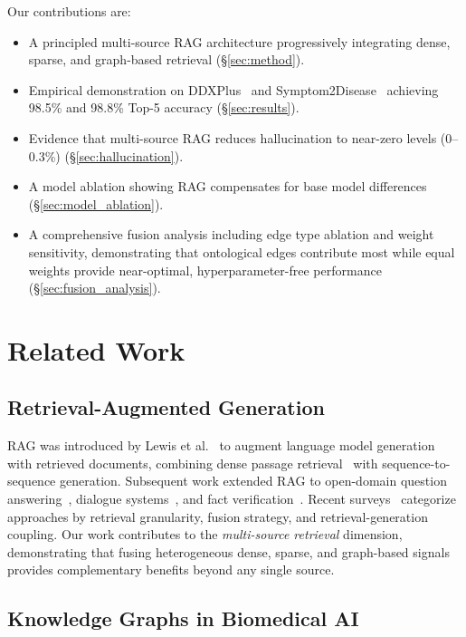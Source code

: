 \documentclass[preprint,12pt]{elsarticle}
\begin{document}
Our contributions are:
\begin{itemize}
    \item A principled multi-source RAG architecture progressively integrating dense, sparse, and graph-based retrieval (\S\ref{sec:method}).
    \item Empirical demonstration on DDXPlus~\cite{fansi2022ddxplus} and Symptom2Disease~\cite{gretelai_s2d} achieving 98.5\% and 98.8\% Top-5 accuracy (\S\ref{sec:results}).
    \item Evidence that multi-source RAG reduces hallucination to near-zero levels (0–0.3\%) (\S\ref{sec:hallucination}).
    \item A model ablation showing RAG compensates for base model differences (\S\ref{sec:model_ablation}).
    \item A comprehensive fusion analysis including edge type ablation and weight sensitivity, demonstrating that ontological edges contribute most while equal weights provide near-optimal, hyperparameter-free performance (\S\ref{sec:fusion_analysis}).
\end{itemize}

\section{Related Work}
\label{sec:related}

\subsection{Retrieval-Augmented Generation}

RAG was introduced by Lewis et al.~\cite{lewis2020retrieval} to augment language model generation with retrieved documents, combining dense passage retrieval~\cite{karpukhin2020dense} with sequence-to-sequence generation. Subsequent work extended RAG to open-domain question answering~\cite{izacard2021leveraging}, dialogue systems~\cite{shuster2021retrieval}, and fact verification~\cite{thorne2018fever}. Recent surveys~\cite{gao2023retrieval,zhao2024retrieval} categorize approaches by retrieval granularity, fusion strategy, and retrieval-generation coupling. Our work contributes to the \emph{multi-source retrieval} dimension, demonstrating that fusing heterogeneous dense, sparse, and graph-based signals provides complementary benefits beyond any single source.

\subsection{Knowledge Graphs in Biomedical AI}
\end{document}
